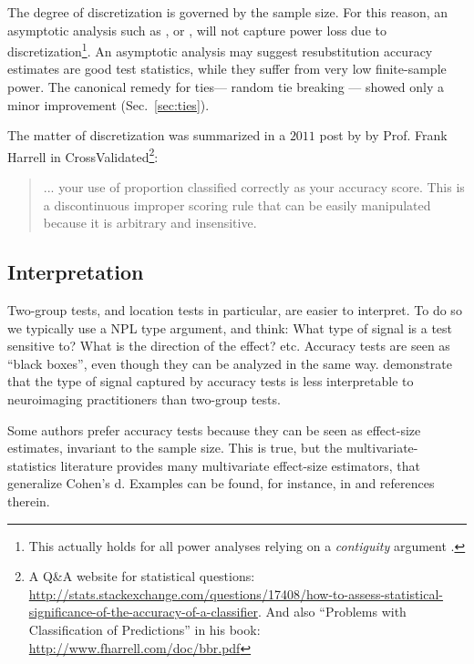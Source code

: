 \documentclass[journal]{IEEEtran}
\begin{document}
The degree of discretization is governed by the sample size. 
For this reason, an asymptotic analysis such as \cite{ramdas_classification_2016}, or \cite{golland_permutation_2005}, will not capture power loss due to discretization\footnote{This actually holds for all power analyses relying on a \emph{contiguity} argument \cite[Ch.6]{vaart_asymptotic_1998}.}.
An asymptotic analysis may suggest resubstitution accuracy estimates are good test statistics, while they suffer from very low finite-sample power. 
The canonical remedy for ties--- random tie breaking --- showed only a minor improvement (Sec.~\ref{sec:ties}).

The matter of discretization was summarized in a $2011$ post by by Prof. Frank Harrell in \textsf{CrossValidated\footnote{A Q\&A website for statistical questions: \url{http://stats.stackexchange.com/questions/17408/how-to-assess-statistical-significance-of-the-accuracy-of-a-classifier}. And also ``Problems with Classification of Predictions'' in his book: \url{http://www.fharrell.com/doc/bbr.pdf}}}:
\begin{quote}
	... your use of proportion classified correctly as your accuracy score. This is a discontinuous improper scoring rule that can be easily manipulated because it is arbitrary and insensitive.
\end{quote}





\subsection{Interpretation}
Two-group tests, and location tests in particular, are easier to interpret. 
To do so we typically use a NPL type argument, and think:
What type of signal is a test sensitive to?
What is the direction of the effect? etc.
Accuracy tests are seen as ``black boxes'', even though they can be analyzed in the same way. 
\cite{gilron2017s} demonstrate that the type of signal captured by accuracy tests is less interpretable to neuroimaging practitioners than two-group tests. 

Some authors prefer accuracy tests because they can be seen as effect-size estimates, invariant to the sample size. 
This is true, but the multivariate-statistics literature provides many multivariate effect-size estimators, that generalize Cohen's d. 
Examples can be found, for instance, in \cite{stevens2012applied} and references therein. 
\end{document}
